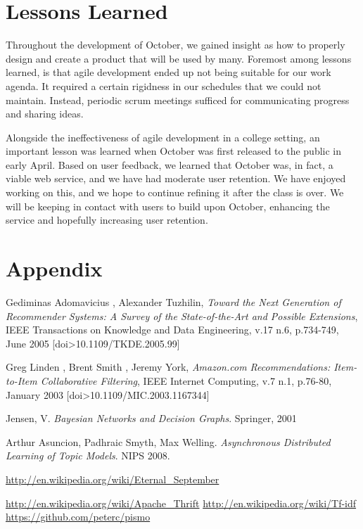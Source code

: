 \documentclass[11pt,letterpaper]{article}
\begin{document}
\section{Lessons Learned}
\newpage

Throughout the development of October, we gained insight as how to properly design and create a product that will be used by many. 
Foremost among lessons learned, is that agile development ended up not being suitable for our work agenda. 
It required a certain rigidness in our schedules that we could not maintain. 
Instead, periodic scrum meetings sufficed for communicating progress and sharing ideas. 

Alongside the ineffectiveness of agile development in a college setting, an important lesson was learned when October was first released to the public in early April. 
Based on user feedback, we learned that October was, in fact, a viable web service, and we have had moderate user retention. 
We have enjoyed working on this, and we hope to continue refining it after the class is over. 
We will be keeping in contact with users to build upon October, enhancing the service and hopefully increasing user retention.
 
 

\section{Appendix}

\newpage
\newpage
\begin{thebibliography}{6}
   Gediminas Adomavicius , Alexander Tuzhilin, \textit{Toward the Next Generation of Recommender Systems: A Survey of the State-of-the-Art and Possible Extensions}, IEEE Transactions on Knowledge and Data Engineering, v.17 n.6, p.734-749, June 2005  [doi>10.1109/TKDE.2005.99]

   Greg Linden , Brent Smith , Jeremy York, \textit{Amazon.com Recommendations: Item-to-Item Collaborative Filtering}, IEEE Internet Computing, v.7 n.1, p.76-80, January 2003  [doi>10.1109/MIC.2003.1167344]

   Jensen, V. \textit{Bayesian Networks and Decision Graphs}. Springer, 2001

   Arthur Asuncion, Padhraic Smyth, Max Welling. \textit{Asynchronous Distributed Learning of Topic Models}. NIPS 2008.

   \url{http://en.wikipedia.org/wiki/Eternal\_September}

   \url{http://en.wikipedia.org/wiki/Apache\_Thrift}
   \url{http://en.wikipedia.org/wiki/Tf-idf}
   \url{https://github.com/peterc/pismo}


\end{thebibliography}
\end{document}
